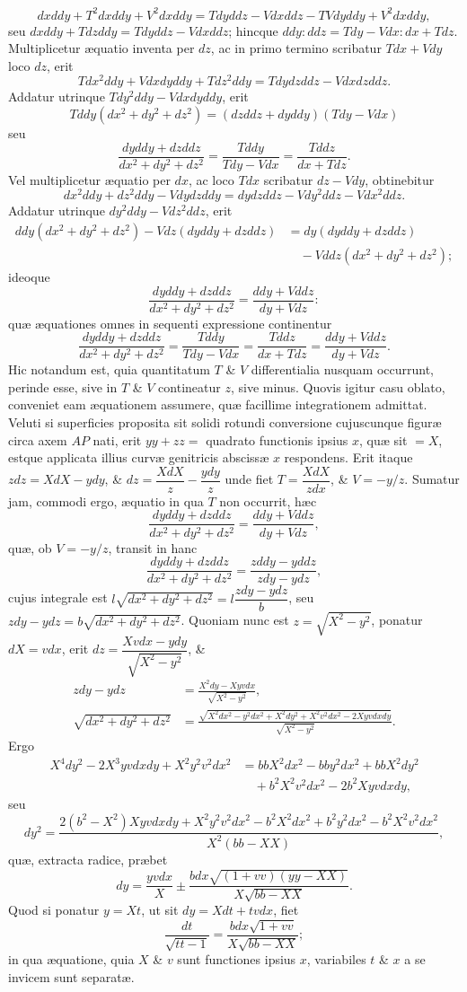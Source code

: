 \[dxddy+T^2dxddy+V^2dxddy=Tdyddz-Vdxddz-TVdyddy+V^2dxddy,\]
seu $dxddy+Tdzddy=Tdyddz-Vdxddz$; hincque $ddy:ddz=Tdy-Vdx:dx+Tdz$. Multiplicetur æquatio inventa per $dz$, ac in primo termino scribatur $Tdx+Vdy$ loco $dz$, erit
\[Tdx^2ddy+Vdxdyddy+Tdz^2ddy=Tdydzddz-Vdxdzddz.\]
Addatur utrinque $Tdy^2ddy-Vdxdyddy$, erit
\[Tddy(dx^2+dy^2+dz^2)=(dzddz+dyddy)(Tdy-Vdx)\]
seu
\[\frac{dyddy+dzddz}{dx^2+dy^2+dz^2}=\frac{Tddy}{Tdy-Vdx}=\frac{Tddz}{dx+Tdz}.\]
Vel multiplicetur æquatio per $dx$, ac loco $Tdx$ scribatur $dz-Vdy$, obtinebitur
\[dx^2ddy+dz^2ddy-Vdydzddy=dydzddz-Vdy^2ddz-Vdx^2ddz.\]
Addatur utrinque $dy^2ddy-Vdz^2ddz$, erit
\[\begin{aligned}ddy(dx^2+dy^2+dz^2)-Vdz(dyddy+dzddz)&=dy(dyddy+dzddz)\\&\quad-Vddz(dx^2+dy^2+dz^2);\end{aligned}\]
ideoque
\[\frac{dyddy+dzddz}{dx^2+dy^2+dz^2}=\frac{ddy+Vddz}{dy+Vdz}:\]
quæ æquationes omnes in sequenti expressione continentur
\[\frac{dyddy+dzddz}{dx^2+dy^2+dz^2}=\frac{Tddy}{Tdy-Vdx}=\frac{Tddz}{dx+Tdz}=\frac{ddy+Vddz}{dy+Vdz}.\]
Hic notandum est, quia quantitatum $T$ \& $V$ differentialia nusquam occurrunt, perinde esse, sive in $T$ \& $V$ contineatur $z$, sive minus. Quovis igitur casu oblato, conveniet eam æquationem assumere, quæ facillime integrationem admittat. Veluti si superficies proposita sit solidi rotundi conversione cujuscunque figuræ circa axem $AP$ nati, erit $yy+zz=$ quadrato functionis ipsius $x$, quæ sit $=X$, estque applicata illius curvæ genitricis abscissæ $x$ respondens. Erit itaque $zdz=XdX-ydy$, \& $dz=\dfrac{XdX}{z}-\dfrac{ydy}{z}$ unde fiet $T=\dfrac{XdX}{zdx}$, \& $V=-y/z$. Sumatur jam, commodi ergo, æquatio in qua $T$ non
occurrit, hæc
\[\frac{dyddy+dzddz}{dx^2+dy^2+dz^2}=\frac{ddy+Vddz}{dy+Vdz},\]
quæ, ob $V=-y/z$, transit in hanc
\[\frac{dyddy+dzddz}{dx^2+dy^2+dz^2}=\frac{zddy-yddz}{zdy-ydz},\]
cujus integrale est $l\sqrt{dx^2+dy^2+dz^2}=l\dfrac{zdy-ydz}{b}$, seu $zdy-ydz=b\sqrt{dx^2+dy^2+dz^2}$. Quoniam nunc est $z=\sqrt{X^2-y^2}$, ponatur $dX=vdx$, erit $dz=\dfrac{Xvdx-ydy}{\sqrt{X^2-y^2}}$, \&
\[\begin{aligned}zdy-ydz&=\frac{X^2dy-Xyvdx}{\sqrt{X^2-y^2}},\\\sqrt{dx^2+dy^2+dz^2}&=\frac{\sqrt{X^2dx^2-y^2dx^2+X^2dy^2+X^2v^2dx^2-2Xyvdxdy}}{\sqrt{X^2-y^2}}.\end{aligned}\]
Ergo
\[\begin{aligned}X^4dy^2-2X^3yvdxdy+X^2y^2v^2dx^2&=bbX^2dx^2-bby^2dx^2+bbX^2dy^2\\&\quad+b^2X^2v^2dx^2-2b^2Xyvdxdy,\end{aligned}\]
seu
\[dy^2=\frac{2(b^2-X^2)Xyvdxdy+X^2y^2v^2dx^2-b^2X^2dx^2+b^2y^2dx^2-b^2X^2v^2dx^2}{X^2(bb-XX)},\]
quæ, extracta radice, præbet
\[dy=\frac{yvdx}{X}\pm\frac{bdx\sqrt{(1+vv)(yy-XX)}}{X\sqrt{bb-XX}}.\]
Quod si ponatur $y=Xt$, ut sit $dy=Xdt+tvdx$, fiet
\[\frac{dt}{\sqrt{tt-1}}=\frac{bdx\sqrt{1+vv}}{X\sqrt{bb-XX}};\]
in qua æquatione, quia $X$ \& $v$ sunt functiones ipsius $x$, variabiles $t$ \& $x$ a se invicem sunt separatæ.
